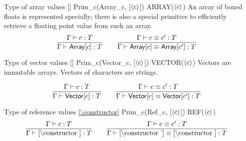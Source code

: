 \documentclass[12pt,twoside,fleqn]{article}
\begin{document}
  {Type of array values}
  {[\constructor]}
  {Prim\_c(Array\_c, [$\langle{c}\rangle$])}
  {ARRAY($\langle{c}\rangle$)}
  {An array of boxed floats is represented specially; there is also
   a special primitive to efficiently retrieve a floating point value
   from such an array.}
  {\[\frac
    {\Gamma\vdash c : T}
    {\Gamma\vdash \mathsf{Array}[c] : T}
   \qquad
   \frac
    {\Gamma\vdash c \equiv c' : T}
    {\Gamma\vdash \mathsf{Array}[c] \equiv \mathsf{Array}[c'] : T}
  \]}   


  {Type of vector values}
  {[\constructor]}
  {Prim\_c(Vector\_c, [$\langle{c}\rangle$])}
  {VECTOR($\langle{c}\rangle$)}
  {Vectors are immutable arrays.  Vectors of characters are strings.}\par
  {\[\frac
    {\Gamma\vdash c : T}
    {\Gamma\vdash \mathsf{Vector}[c] : T}
   \qquad
   \frac
    {\Gamma\vdash c \equiv c' : T}
    {\Gamma\vdash \mathsf{Vector}[c] \equiv \mathsf{Vector}[c'] : T}
  \]}

  {Type of reference values}
  {\cref{\constructor}}
  {Prim\_c(Ref\_c, [$\langle{c}\rangle$])}
  {REF($\langle{c}\rangle$)}
  {}
  {\[\frac
    {\validconstructor{\context}{\constructor}{\ktype}}
    {\validconstructor{\context}{\cref{\constructor}}{\ktype}}
   \qquad
   \frac
    {\equivconstructor{\context}{\constructor}{\constructor'}{\ktype}}
    {\equivconstructor{\context}{\cref{\constructor'}}
         {\cref{\constructor}}
         {\ktype}}
  \]}
\end{document}
